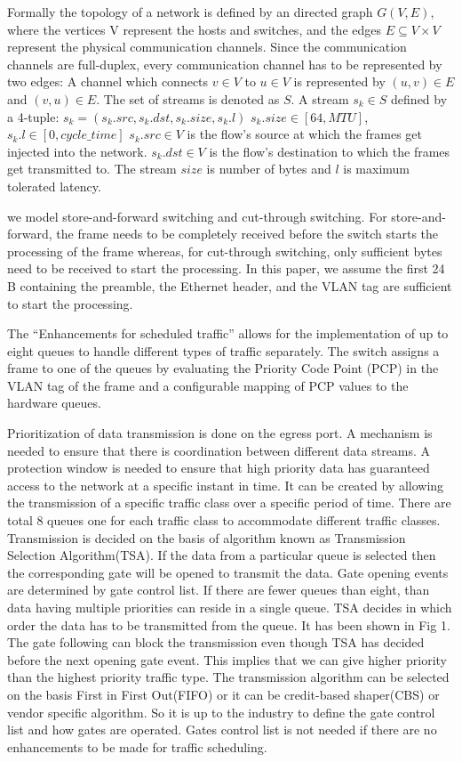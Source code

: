 \documentclass[conference]{IEEEtran}
\begin{document}
Formally the topology of a network is defined by an directed graph $G(V, E)$, where the vertices V represent the hosts and switches, and the edges $E \subseteq V \times V$ represent the physical communication channels. Since the communication channels are full-duplex, every communication channel has to be represented by two edges: A channel which connects $v \in V$ to $u \in V$ is represented by $(u, v) \in E$ and $(v, u) \in E$.
 The set of streams is denoted as $S$. A stream  $s_k \in S$ defined by a 4-tuple: $s_k = ( s_k.src, s_k.dst, s_k.size, s_k.l)$ $s_k.size \in [64,MTU]$, $s_k.l \in [0,cycle\_time]$  
$s_k.src \in V$ is the flow’s source at which the frames get injected into the network. $s_k.dst \in V$ is the flow’s destination to which the frames get transmitted to. The stream $size$ is number of bytes and $l$ is maximum tolerated latency.

we model store-and-forward switching and cut-through switching. For store-and-forward, the frame needs to be completely received before the switch starts the processing of the frame whereas, for cut-through switching, only sufficient bytes need to be received to start the processing. In this paper, we assume the first 24 B containing the preamble, the Ethernet header, and the VLAN tag are sufficient to start the processing. 

The “Enhancements for scheduled traffic” allows for the implementation of up to eight queues to handle different types of traffic separately. The switch assigns a frame to one of the queues by evaluating the Priority Code Point (PCP) in the VLAN tag of the frame and a configurable mapping of PCP values to the hardware queues. 

Prioritization of data transmission is done on the egress port. A mechanism is needed to ensure that there is coordination between different data streams. A protection window is needed to ensure that high priority data has guaranteed access to the network at a specific instant in time. It can be created by allowing the transmission of a specific traffic class over a specific period of time. There are total 8 queues one for each traffic class to accommodate different traffic classes. Transmission is decided on the basis of algorithm known as Transmission Selection Algorithm(TSA). If the data from a particular queue is selected then the corresponding gate will be opened to transmit the data. Gate opening events are determined by gate control list. If there are fewer queues than eight, than data having multiple priorities can reside in a single queue. TSA decides in which order the data has to be transmitted from the queue. It has been shown in 
Fig 1. The gate following can block the transmission even though TSA has decided before the next opening gate event. This implies that we can give higher priority than the highest priority traffic type. The transmission algorithm can be selected on the basis First in First Out(FIFO) or it can be credit-based shaper(CBS) or vendor specific algorithm. So it is up to the industry to define the gate control list and how gates are operated. Gates control list is not needed if there are no enhancements to be made for traffic scheduling.
\end{document}
